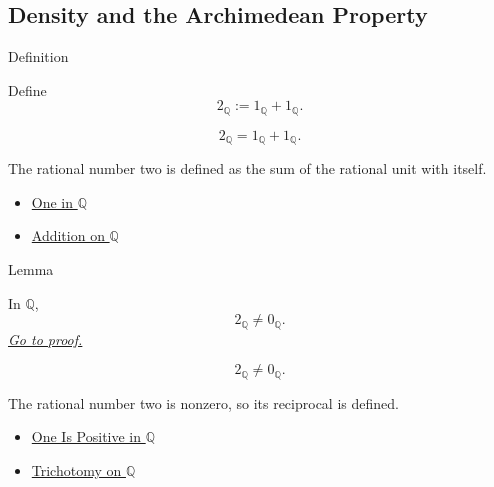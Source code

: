 \subsection*{Density and the Archimedean Property}

\begin{definitionbox}{Definition}
\begin{definition}
\label{def:two-in-q}
Define
\[
2_{\mathbb{Q}}:=1_{\mathbb{Q}}+1_{\mathbb{Q}}.
\]
\end{definition}
\end{definitionbox}

\begin{remark*}
\[
2_{\mathbb{Q}}=1_{\mathbb{Q}}+1_{\mathbb{Q}}.
\]
\end{remark*}

\begin{remark*}[Interpretation]
The rational number two is defined as the sum of the rational unit with
itself.
\end{remark*}

\begin{dependencies}
\begin{itemize}
  \item \hyperref[def:one-in-q]{One in $\mathbb{Q}$}
  \item \hyperref[def:addition-on-q-classes]{Addition on $\mathbb{Q}$}
\end{itemize}
\end{dependencies}

\begin{lemmabox}{Lemma}
\begin{lemma}
\label{lem:two-nonzero-in-q}
In $\mathbb{Q}$,
\[
2_{\mathbb{Q}}\ne 0_{\mathbb{Q}}.
\]
\hyperref[prf:two-nonzero-in-q]{\textit{Go to proof.}}
\end{lemma}
\end{lemmabox}

\begin{remark*}
\[
2_{\mathbb{Q}}\ne 0_{\mathbb{Q}}.
\]
\end{remark*}

\begin{remark*}[Interpretation]
The rational number two is nonzero, so its reciprocal is defined.
\end{remark*}

\begin{dependencies}
\begin{itemize}
  \item \hyperref[cor:one-positive-on-q]{One Is Positive in $\mathbb{Q}$}
  \item \hyperref[thm:trichotomy-on-q]{Trichotomy on $\mathbb{Q}$}
\end{itemize}
\end{dependencies}

